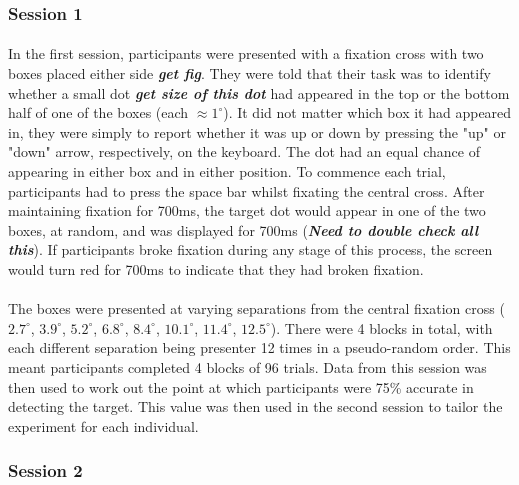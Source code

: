 \documentclass[12pt]{article}
\begin{document}
\subsubsection*{Session 1}
\paragraph{} In the first session, participants were presented with a fixation cross with two boxes placed either side \textit{\textbf{get fig}}. They were told that their task was to identify whether a small dot \textit{\textbf{get size of this dot}} had appeared in the top or the bottom half of one of the boxes (each $\approx1^{\circ}$). It did not matter which box it had appeared in, they were simply to report whether it was up or down by pressing the "up" or "down" arrow, respectively, on the keyboard. The dot had an equal chance of appearing in either box and in either position. To commence each trial, participants had to press the space bar whilst fixating the central cross. After maintaining fixation for 700ms, the target dot would appear in one of the two boxes, at random, and was displayed for 700ms (\textit{\textbf{Need to double check all this}}). If participants broke fixation during any stage of this process, the screen would turn red for 700ms to indicate that they had broken fixation. 

\paragraph{} The boxes were presented at varying separations from the central fixation cross ($2.7^{\circ}$, $3.9^{\circ}$, $5.2^{\circ}$, $6.8^{\circ}$, $8.4^{\circ}$, $10.1^{\circ}$, $11.4^{\circ}$, $12.5^{\circ}$). There were 4 blocks in total, with each different separation being presenter 12 times in a pseudo-random order. This meant participants completed 4 blocks of 96 trials. Data from this session was then used to work out the point at which participants were 75\% accurate in detecting the target. This value was then used in the second session to tailor the experiment for each individual.

\subsubsection*{Session 2}  
\end{document}
